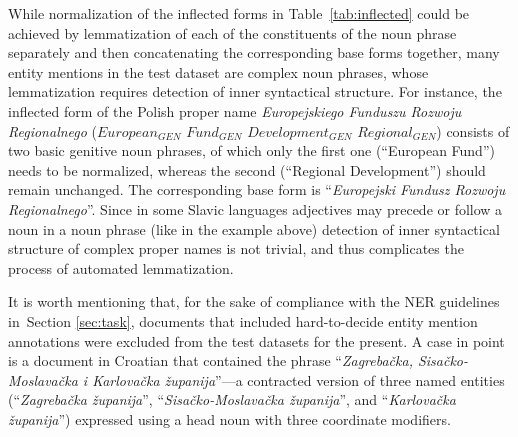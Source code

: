 \documentclass[11pt]{article}
\begin{document}
While normalization of the inflected forms in Table~\ref{tab:inflected} could be achieved
by lemmatization of each of the constituents of the noun phrase separately and then concatenating
the corresponding base forms together, many entity mentions in the test dataset are complex noun phrases, 
whose lemmatization requires detection of inner syntactical structure. For instance, the inflected form 
of the Polish proper name \textit{Europejskiego Funduszu Rozwoju Regionalnego} 
($European_{GEN}$ $Fund_{GEN}$ $Development_{GEN}$ $Regional_{GEN}$) consists of two basic genitive 
noun phrases, of which only the first one (``European Fund'') needs to be normalized, whereas the 
second (``Regional Development'') should remain unchanged. The corresponding base form
is ``\textit{Europejski Fundusz Rozwoju Regionalnego}''. Since in some Slavic languages
adjectives may precede or follow a noun in a noun phrase (like in the example above) 
detection of inner syntactical structure of complex proper names is not trivial, and thus complicates
the process of automated lemmatization.

It is worth mentioning that, for the sake of compliance with the NER guidelines in~Section
\ref{sec:task}, documents that included hard-to-decide entity mention annotations were
excluded from the test datasets for the present.  {A case in point is a document in Croatian
  that contained the phrase ``\textit{Zagrebačka, Sisačko-Moslavačka i Karlovačka
    županija}''---a contracted version of three named entities (``\textit{Zagrebačka
    županija}'', ``\textit{Sisačko-Moslavačka županija}'', and ``\textit{Karlovačka
    županija}'') expressed using a head noun with three coordinate modifiers.}
\end{document}
